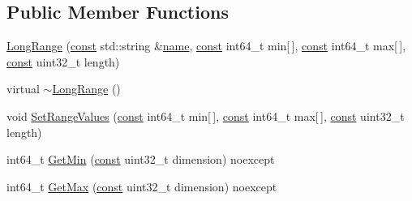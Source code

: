 \subsection*{Public Member Functions}
\begin{DoxyCompactItemize}
\item 
\mbox{\hyperlink{classlucene_1_1core_1_1document_1_1LongRange_a7f20f8b15104f6ea7e3cab36310ce777}{Long\+Range}} (\mbox{\hyperlink{ZlibCrc32_8h_a2c212835823e3c54a8ab6d95c652660e}{const}} std\+::string \&\mbox{\hyperlink{classlucene_1_1core_1_1document_1_1Field_a52f673f3b3abb14b180f5159f4726537}{name}}, \mbox{\hyperlink{ZlibCrc32_8h_a2c212835823e3c54a8ab6d95c652660e}{const}} int64\+\_\+t min\mbox{[}$\,$\mbox{]}, \mbox{\hyperlink{ZlibCrc32_8h_a2c212835823e3c54a8ab6d95c652660e}{const}} int64\+\_\+t max\mbox{[}$\,$\mbox{]}, \mbox{\hyperlink{ZlibCrc32_8h_a2c212835823e3c54a8ab6d95c652660e}{const}} uint32\+\_\+t length)
\item 
virtual \mbox{\hyperlink{classlucene_1_1core_1_1document_1_1LongRange_a43d92b6373148b460ad9266023ab57ec}{$\sim$\+Long\+Range}} ()
\item 
void \mbox{\hyperlink{classlucene_1_1core_1_1document_1_1LongRange_a2ddad3123f8537aa9958f0e61052aa2a}{Set\+Range\+Values}} (\mbox{\hyperlink{ZlibCrc32_8h_a2c212835823e3c54a8ab6d95c652660e}{const}} int64\+\_\+t min\mbox{[}$\,$\mbox{]}, \mbox{\hyperlink{ZlibCrc32_8h_a2c212835823e3c54a8ab6d95c652660e}{const}} int64\+\_\+t max\mbox{[}$\,$\mbox{]}, \mbox{\hyperlink{ZlibCrc32_8h_a2c212835823e3c54a8ab6d95c652660e}{const}} uint32\+\_\+t length)
\item 
int64\+\_\+t \mbox{\hyperlink{classlucene_1_1core_1_1document_1_1LongRange_afaeef89fe3e5d4b30f16ba38d8479f4d}{Get\+Min}} (\mbox{\hyperlink{ZlibCrc32_8h_a2c212835823e3c54a8ab6d95c652660e}{const}} uint32\+\_\+t dimension) noexcept
\item 
int64\+\_\+t \mbox{\hyperlink{classlucene_1_1core_1_1document_1_1LongRange_a2daa2b07e3b18836fc45e6210890aaf9}{Get\+Max}} (\mbox{\hyperlink{ZlibCrc32_8h_a2c212835823e3c54a8ab6d95c652660e}{const}} uint32\+\_\+t dimension) noexcept
\end{DoxyCompactItemize}
